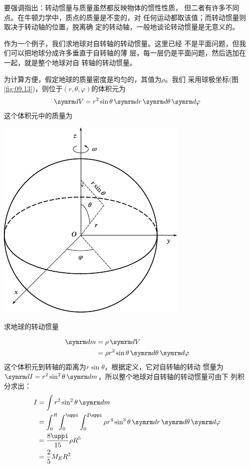 要强调指出：转动惯量与质量虽然都反映物体的惯性性质，
但二者有许多不同点。在牛顿力学中，质点的质量是不变的，对
任何运动都取该值；而转动惯量则取决于转动轴的位置，脱离确
定的转动轴，一般地谈论转动惯量是无意义的。

作为一个例子，我们求地球对自转轴的转动惯量。这里已经
不是平面问题，但我们可以把地球分成许多垂直于自转轴的薄
层，每一层仍是平面问题，然后选加在一起，就是整个地球对自
转轴的转动惯量。

为计算方便，假定地球的质量密度是均匀的，其值为$ \rho $。我们
采用球极坐标(图\ref{fig:09.13})，则位于$ \left( r, \theta, \varphi \right) $的体积元为
\begin{equation*}
    \dif V = r ^ { 2 } \sin \theta \dif r \dif \theta \dif \varphi
\end{equation*}
这个体积元中的质量为

\begin{figurex}
    \centering
    \includegraphics{figure/fig09.13}
    \caption{求地球的转动惯量}
    \label{fig:09.13}
\end{figurex}
\begin{equation*}
    \begin{split}
        \dif m &= \rho \dif V \\
        &= \rho r ^ { 2 } \sin \theta \dif \theta \dif \varphi
    \end{split}
\end{equation*}
这个体积元到转轴的距离为$ r \sin \theta  $，根据定义，它对自转轴的转动
惯量为$  \dif I = r ^ { 2 } \sin ^ { 2 } \theta \dif m   $，所以整个地球对自转轴的转动惯量可由下
列积分求出：
\begin{equation*}
    \begin{split}
        I &= \int  r ^ { 2 } \sin ^ { 2 } \theta \dif m \\
        &= \int _ 0 ^ { R } \int _ 0 ^ { \uppi } \int _ 0 ^ { 2 \uppi } \rho r ^ { 4 } \sin ^ { 3 } \theta \dif r \dif \theta \dif \varphi \\
        &= \frac { 8 \uppi } { 1 5 } \rho R ^ { 5 } \\
        &= \frac { 2 } { 5 } M _ { E } R ^ { 2 }
    \end{split}
\end{equation*}
